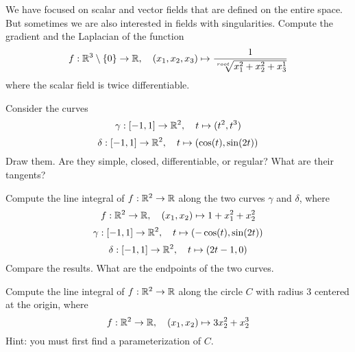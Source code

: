 \documentclass[11pt]{article}
\begin{document}
\def\hidesolutions{}

\begin{exercise}
    We have focused on scalar and vector fields that are defined on the entire space. 
    But sometimes we are also interested in fields with singularities. 
    Compute the gradient and the Laplacian of the function 
    \[
        f : \mathbb{R}^3 \setminus \{0\} \rightarrow \mathbb{R}, \quad (x_1,x_2,x_3) \mapsto \frac{1}{\sqrt[root]{x_1^2+x_2^2+x_3^1}}
    \]
    where the scalar field is twice differentiable. 
\end{exercise}
\begin{solution}     
\end{solution}

\begin{exercise}
    Consider the curves 
    \[
        \gamma : [-1,1] \rightarrow \mathbb{R}^2, \quad t \mapsto ( t^2, t^3 )
    \]
    \[
        \delta : [-1,1] \rightarrow \mathbb{R}^2, \quad t \mapsto ( \cos(t), \sin(2t) )
    \]
    Draw them. Are they simple, closed, differentiable, or regular? What are their tangents?
\end{exercise}
\begin{solution}     
\end{solution}

\begin{exercise}
    Compute the line integral of $f : \mathbb{R}^2 \rightarrow \mathbb{R}$ along the two curves $\gamma$ and $\delta$, 
    where 
    \[
        f : \mathbb{R}^2 \to \mathbb{R}, \quad (x_1,x_2) \mapsto 1 + x_1^2 + x_2^2
    \]
    \[
        \gamma : [-1,1] \rightarrow \mathbb{R}^2, \quad t \mapsto ( -\cos(t), \sin(2t) )
    \]
    \[
        \delta : [-1,1] \rightarrow \mathbb{R}^2, \quad t \mapsto (2t-1,0)
    \]
    Compare the results. What are the endpoints of the two curves.  
\end{exercise}
\begin{solution}     
\end{solution}

\begin{exercise}
    Compute the line integral of $f : \mathbb{R}^2 \rightarrow \mathbb{R}$ 
    along the circle $C$ with radius $3$ centered at the origin, where 
    \[
        f : \mathbb{R}^2 \to \mathbb{R}, \quad (x_1,x_2) \mapsto 3 x_2^2 + x_2^3
    \]
    Hint: you must first find a parameterization of $C$. 
\end{exercise}
\begin{solution}     
\end{solution}
\end{document}
